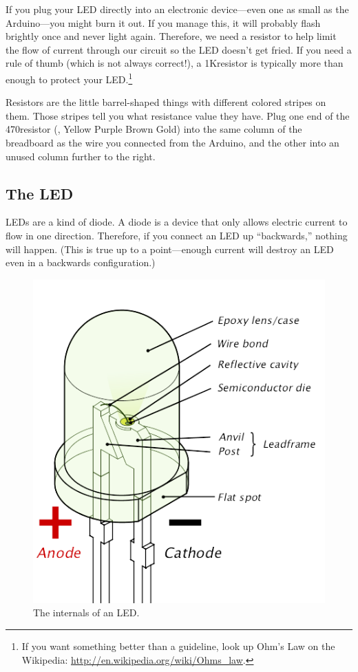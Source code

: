 If you plug your LED directly into an electronic device---even one as small as the Arduino---you might burn it out. If you manage this, it will probably flash brightly once and never light again. Therefore, we need a resistor to help limit the flow of current through our circuit so the LED doesn't get fried. If you need a rule of thumb (which is not always correct!), a 1K\ohm resistor is typically more than enough to protect your LED.\footnote{If you want something better than a guideline, look up Ohm's Law on the Wikipedia: \url{http://en.wikipedia.org/wiki/Ohms\_law}.}

Resistors are the little barrel-shaped things with different colored stripes on them. Those stripes tell you what resistance value they have. Plug one end of the 470\ohm resistor (, Yellow Purple Brown Gold) into the same column of the breadboard as the wire you connected from the Arduino, and the other into an unused column further to the right. 



\subsection{The LED}
LEDs are a kind of diode. A diode is a device that only allows electric current to flow in one direction. Therefore, if you connect an LED up ``backwards,'' nothing will happen. (This is true up to a point---enough current will destroy an LED even in a backwards configuration.) 

\begin{figure}[ht]
  \begin{center}
    \includegraphics[width=0.5\linewidth]{images/ch2-led-internals}
    \caption{The internals of an LED.}
    \label{diagram:ch2-led-internals}
  \end{center}
\end{figure}


